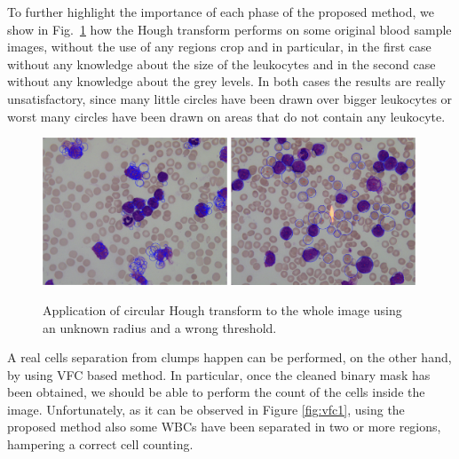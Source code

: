 \documentclass[final,a4paper,12pt,english]{UnicaPhdThesis3}
\begin{document}
	To further highlight the importance of each phase of the proposed method, we show in Fig.~\ref{fig:ex10} how the Hough transform performs on some original blood sample images, without the use of any regions crop and in particular, in the first case without any knowledge about the size of the leukocytes and in the second case without any knowledge about the grey levels. In both cases the results are really unsatisfactory, since many little circles have been drawn over bigger leukocytes or worst many circles have been drawn on areas that do not contain any leukocyte. 
	\begin{figure}[!t]
		\centering
		\includegraphics[width=0.49\textwidth]{images/2016_1_mva/wrongradius}
		\includegraphics[width=0.49\textwidth]{images/2016_1_mva/wrongthreshold}
		\caption{\label{fig:ex10}Application of circular Hough transform to the whole image using an unknown radius and a wrong threshold.}
	\end{figure}
	
	A real cells separation from clumps happen can be performed, on the other hand, by using VFC based method. 
	In particular, once the cleaned binary mask has been obtained, we should be able to perform the count of the cells inside the image. Unfortunately, as it can be observed in Figure \ref{fig:vfc1}, using the proposed method also some WBCs have been separated in two or more regions, hampering a correct cell counting.
	
\end{document}
